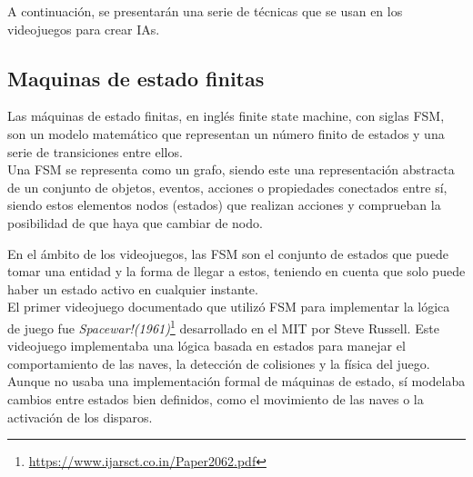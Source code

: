 A continuación, se presentarán una serie de técnicas que se usan en los videojuegos para crear IAs.
\subsection{Maquinas de estado finitas}
Las máquinas de estado finitas, en inglés finite state machine, con siglas FSM, son un modelo matemático que representan un número finito de estados y una serie de transiciones entre ellos. \\

Una FSM se representa como un grafo, siendo este una representación abstracta de un conjunto de objetos, eventos, acciones o propiedades conectados entre sí, siendo estos elementos nodos (estados) que realizan acciones y comprueban la posibilidad de que haya que cambiar de nodo. 

En el ámbito de los videojuegos, las FSM son el conjunto de estados que puede tomar una entidad y la forma de llegar a estos, teniendo en cuenta que solo puede haber un estado activo en cualquier instante. \\

El primer videojuego documentado que utilizó FSM para implementar la lógica de juego fue \textit{Spacewar!(1961)}\footnote{\url{https://www.ijarsct.co.in/Paper2062.pdf}} desarrollado en el MIT por Steve Russell. Este videojuego implementaba una lógica basada en estados para manejar el comportamiento de las naves, la detección de colisiones y la física del juego. Aunque no usaba una implementación formal de máquinas de estado, sí modelaba cambios entre estados bien definidos, como el movimiento de las naves o la activación de los disparos. \\ 

